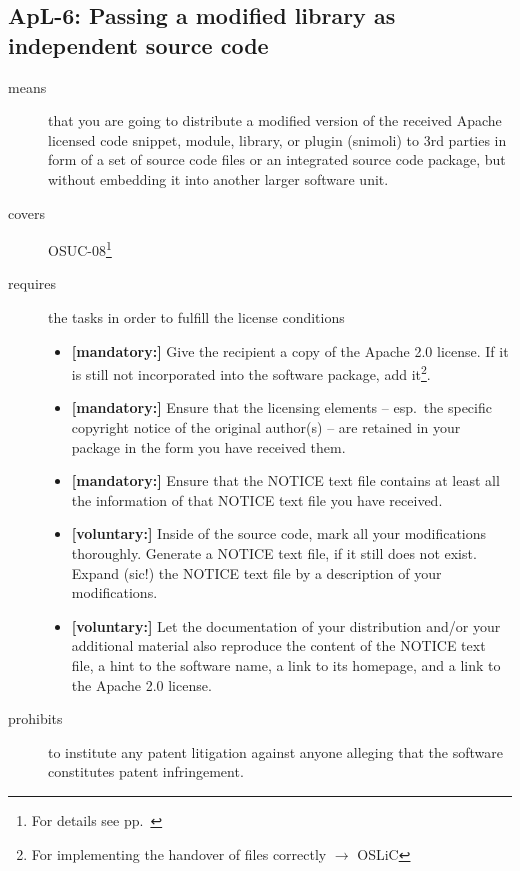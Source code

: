 \subsection{ApL-6: Passing a modified library as independent source code}
\label{OSUC-08-Apache20}

\begin{description}
\item[means] that you are going to distribute a modified version of the received
Apache licensed code snippet, module, library, or plugin (snimoli) to 3rd
parties in form of a set of source code files or an integrated source code
package, but without embedding it into another larger software unit.
\item[covers] OSUC-08\footnote{For details see pp.\ \pageref{OSUC-08-DEF}}
\item[requires] the tasks in order to fulfill the license conditions
\begin{itemize}
  
  \item \textbf{[mandatory:]} Give the recipient a copy of the Apache 2.0
  license. If it is still not incorporated into the software package, add
  it\footnote{For implementing the handover of files correctly $\rightarrow$
  OSLiC \pageref{DistributingFilesHint}}.

  \item \textbf{[mandatory:]} Ensure that the licensing elements -- esp.\ the
  specific copyright notice of the original author(s) -- are retained in your
  package in the form you have received them.
  
  \item \textbf{[mandatory:]} Ensure that the NOTICE text file contains at least
  all the information of that NOTICE text file you have received.
 
  \item \textbf{[voluntary:]} Inside of the source code, mark all your
  modifications thoroughly. Generate a NOTICE text file, if it still does not
  exist. Expand (sic!) the NOTICE text file by a description of your
  modifications.
   
  \item \textbf{[voluntary:]} Let the documentation of your distribution
  and/or your additional material also reproduce the content of the NOTICE text
  file, a hint to the software name, a link to its homepage, and a link to the
  Apache 2.0 license.

\end{itemize}

\item[prohibits] to institute any patent litigation against anyone alleging that
the software constitutes patent infringement.

\end{description}



